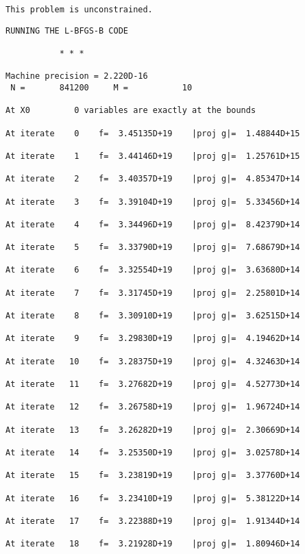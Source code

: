\documentclass[11pt]{article}
\begin{document}
    \begin{Verbatim}[commandchars=\\\{\}]
 This problem is unconstrained.
    \end{Verbatim}

    \begin{Verbatim}[commandchars=\\\{\}]
RUNNING THE L-BFGS-B CODE

           * * *

Machine precision = 2.220D-16
 N =       841200     M =           10

At X0         0 variables are exactly at the bounds

At iterate    0    f=  3.45135D+19    |proj g|=  1.48844D+15

At iterate    1    f=  3.44146D+19    |proj g|=  1.25761D+15

At iterate    2    f=  3.40357D+19    |proj g|=  4.85347D+14

At iterate    3    f=  3.39104D+19    |proj g|=  5.33456D+14

At iterate    4    f=  3.34496D+19    |proj g|=  8.42379D+14

At iterate    5    f=  3.33790D+19    |proj g|=  7.68679D+14

At iterate    6    f=  3.32554D+19    |proj g|=  3.63680D+14

At iterate    7    f=  3.31745D+19    |proj g|=  2.25801D+14

At iterate    8    f=  3.30910D+19    |proj g|=  3.62515D+14

At iterate    9    f=  3.29830D+19    |proj g|=  4.19462D+14

At iterate   10    f=  3.28375D+19    |proj g|=  4.32463D+14

At iterate   11    f=  3.27682D+19    |proj g|=  4.52773D+14

At iterate   12    f=  3.26758D+19    |proj g|=  1.96724D+14

At iterate   13    f=  3.26282D+19    |proj g|=  2.30669D+14

At iterate   14    f=  3.25350D+19    |proj g|=  3.02578D+14

At iterate   15    f=  3.23819D+19    |proj g|=  3.37760D+14

At iterate   16    f=  3.23410D+19    |proj g|=  5.38122D+14

At iterate   17    f=  3.22388D+19    |proj g|=  1.91344D+14

At iterate   18    f=  3.21928D+19    |proj g|=  1.80946D+14


\end{Verbatim}
\end{document}
